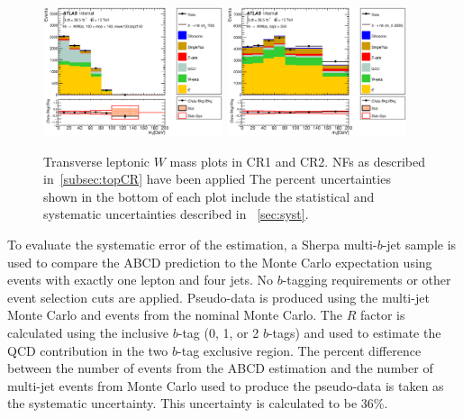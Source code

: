 \begin{figure}[!h]
\begin{center}
\includegraphics*[width=0.47\textwidth] {chapters/dihiggs2/figures/ControlPlots/36ifb_CPUpdated_opt700_mBBcr_plots_094/C_mBBcr_opt700ichep_mww_bbpt150_wlepmtben_regionA_met25d020}
\includegraphics*[width=0.47\textwidth] {chapters/dihiggs2/figures/ControlPlots/36ifb_CPUpdated_opt2000_mBBcr_plots_103/C_mBBcr_opt2000ichep_bbpt350_wlepmtben_regionA_met25d020}
\caption[Transverse leptonic $W$ mass plots in CR1 and CR2.]{Transverse leptonic $W$ mass plots in CR1 and CR2. \ttbar NFs as described in~\ref{subsec:topCR} have been applied The percent uncertainties shown in the bottom of each plot include the statistical and systematic uncertainties described in ~\ref{sec:syst}.}
\label{fig:qcdMtW}
\end{center}
\end{figure}

To evaluate the systematic error of the estimation, a Sherpa multi-$b$-jet sample is used to compare the ABCD prediction to the Monte Carlo expectation using events with exactly one lepton and four jets. No $b$-tagging requirements or other event selection cuts are applied. Pseudo-data is produced using the multi-jet Monte Carlo and events from the nominal \ttbar Monte Carlo. The $R$ factor is calculated using the inclusive $b$-tag (0, 1, or 2 $b$-tags) and used to estimate the QCD contribution in the two $b$-tag exclusive region. The percent difference between the number of events from the ABCD estimation and the number of multi-jet events from Monte Carlo used to produce the pseudo-data is taken as the systematic uncertainty. This uncertainty is calculated to be 36\%.

